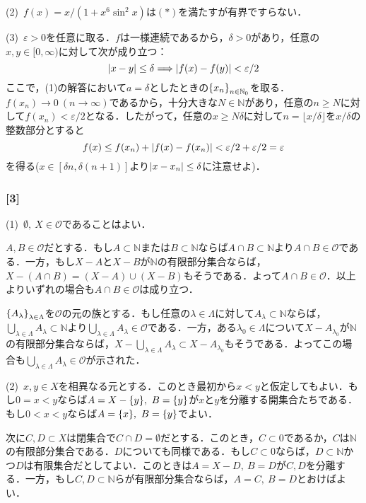 \documentclass[a4j]{ltjsarticle}
\newcommand{\Nset}{\mathbb{N}}
\newcommand{\1}{\mathbbm{1}}
\numberwithin{equation}{section}
\theoremstyle{definition}
\begin{document}
(2)\ $f(x)=x/(1+x^6\sin^2 x)$は$(\ast)$を満たすが有界ですらない．

(3)\ $\varepsilon>0$を任意に取る．$f$は一様連続であるから，$\delta>0$があり，任意の$x,y\in[0,\infty)$に対して次が成り立つ：
\begin{equation}
    \abs{x-y}\leq \delta\Longrightarrow \abs{f(x)-f(y)}<\varepsilon/2
\end{equation}
ここで，(1)の解答において$a=\delta$としたときの$\qty{x_n}_{n\in\Nset_0}$を取る．$f(x_n)\to 0\ (n\to\infty)$であるから，十分大きな$N\in\Nset$があり，任意の$n\geq N$に対して$f(x_n)<\varepsilon/2$となる．したがって，任意の$x\geq N\delta$に対して$n=\lfloor x/\delta\rfloor $を$x/\delta$の整数部分とすると
\begin{equation}
    f(x)\leq f(x_n)+\abs{f(x)-f(x_n)}<\varepsilon/2+\varepsilon/2=\varepsilon
\end{equation}
を得る($x\in [\delta n,\delta(n+1)]$より$\abs{x-x_n}\leq \delta$に注意せよ)．
\subsubsection*{[3]}
(1)\ $\emptyset,\ X\in\mathcal{O}$であることはよい．

$A,B\in \mathcal{O}$だとする．もし$A\subset \Nset$または$B\subset \Nset$ならば$A\cap B\subset \Nset$より$A\cap B\in\mathcal{O}$である．一方，もし$X-A$と$X-B$が$\Nset$の有限部分集合ならば，$X-(A\cap B)=(X-A)\cup(X-B)$もそうである．よって$A\cap B\in \mathcal{O}$．以上よりいずれの場合も$A\cap B\in\mathcal{O}$は成り立つ．

$\qty{A_\lambda}_{\lambda\in\Lambda}$を$\mathcal{O}$の元の族とする．もし任意の$\lambda\in\Lambda$に対して$A_\lambda\subset \Nset$ならば，$\bigcup_{\lambda\in\Lambda}A_\lambda\subset \Nset$より$\bigcup_{\lambda\in\Lambda}A_\lambda\in \mathcal{O}$である．一方，ある$\lambda_0\in\Lambda$について$X-A_{\lambda_0}$が$\Nset$の有限部分集合ならば，$X-\bigcup_{\lambda\in\Lambda}A_\lambda\subset X-A_{\lambda_0}$もそうである．よってこの場合も$\bigcup_{\lambda\in\Lambda}A_\lambda\in\mathcal{O}$が示された．

(2)\ $x,y\in X$を相異なる元とする．このとき最初から$x<y$と仮定してもよい．もし$0=x<y$ならば$A=X-\qty{y},\ B=\qty{y}$が$x$と$y$を分離する開集合たちである．もし$0<x<y$ならば$A=\qty{x},\ B=\qty{y}$でよい．

次に$C,D\subset X$は閉集合で$C\cap D=\emptyset$だとする．このとき，$C\subset \qty{0}$であるか，$C$は$\Nset$の有限部分集合である．$D$についても同様である．もし$C\subset \qty{0}$ならば，$D\subset \Nset$かつ$D$は有限集合だとしてよい．このときは$A=X-D,\ B=D$が$C,D$を分離する．一方，もし$C,D\subset \Nset$らが有限部分集合ならば，$A=C,\ B=D$とおけばよい．
\end{document}
